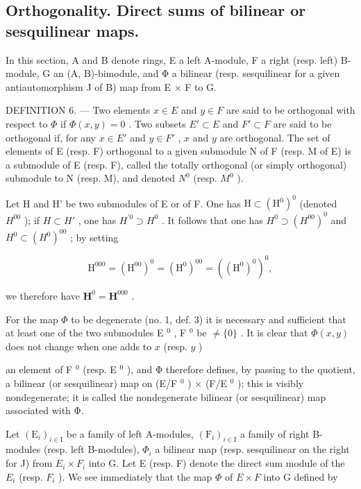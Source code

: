\subsection{Orthogonality. Direct sums of bilinear or sesquilinear maps.}

In this section, A and B denote rings, E a left A-module, F a right (resp. left) B-module, G an (A, B)-bimodule, and Φ a bilinear (resp. sesquilinear for a given antiautomorphism J of B) map from E × F to G.

DEFINITION 6. --- Two elements \(x \in E\) and \(y \in F\) are said to be orthogonal with respect to \(\Phi\) if \(\Phi(x, y) = 0\) . Two subsets \(E' \subset E\) and \(F' \subset F\) are said to be orthogonal if, for any \(x \in E'\) and \(y \in F'\) , \(x\) and \(y\) are orthogonal. The set of elements of E (resp. F) orthogonal to a given submodule N of F (resp. M of E) is a submodule of E (resp. F), called the totally orthogonal (or simply orthogonal) submodule to N (resp. M), and denoted \(N^0\) (resp. \(M^0\) ).

Let H and H' be two submodules of E or of F. One has \(\mathrm{H}\subset(\mathrm{H}^{0})^{0}\) (denoted \(H^{00}\) ); if \(H\subset H'\) , one has \(H^{\prime0}\supset H^{0}\) . It follows that one has \(H^{0}\supset(H^{00})^{0}\) and \(H^{0}\subset(H^{0})^{00}\) ; by setting

\[
\mathrm{H} ^ {0 0 0} = (\mathrm{H} ^ {0 0}) ^ {0} = (\mathrm{H} ^ {0}) ^ {0 0} = ((\mathrm{H} ^ {0}) ^ {0}) ^ {0},
\]

we therefore have \(\mathbf{H}^0 = \mathbf{H}^{000}\) .

For the map \(\Phi\) to be degenerate (no. 1, def. 3) it is necessary and sufficient that at least one of the two submodules E \(^{0}\) , F \(^{0}\) be \(\neq \{0\}\) . It is clear that \(\Phi(x, y)\) does not change when one adds to \(x\) (resp. \(y\) )

an element of F \(^{0}\) (resp. E \(^{0}\) ), and Φ therefore defines, by passing to the quotient, a bilinear (or sesquilinear) map on (E/F \(^{0}\) ) × (F/E \(^{0}\) ); this is visibly nondegenerate; it is called the nondegenerate bilinear (or sesquilinear) map associated with Φ.

Let \((\mathrm{E}_{i})_{i\in\mathrm{I}}\) be a family of left A-modules, \((\mathrm{F}_{i})_{i\in\mathrm{I}}\) a family of right B-modules (resp. left B-modules), \(\Phi_{i}\) a bilinear map (resp. sesquilinear on the right for J) from \(E_{i}\times F_{i}\) into G. Let E (resp. F) denote the direct sum module of the \(E_{i}\) (resp. \(F_{i}\) ). We see immediately that the map \(\Phi\) of \(E\times F\) into G defined by

